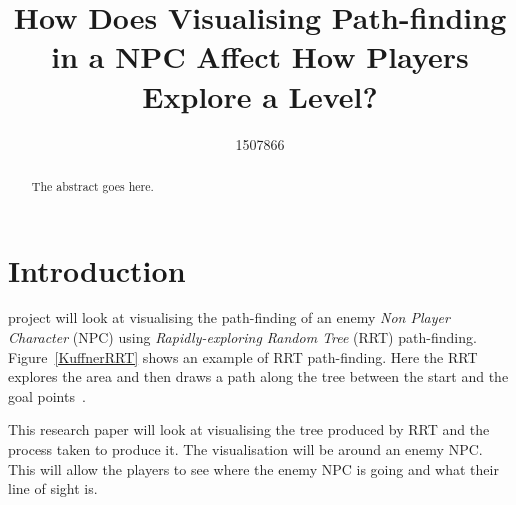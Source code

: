 \documentclass[journal]{IEEEtran}
\begin{document}
%
\title{ How Does Visualising Path-finding in a NPC Affect How Players Explore a Level?}
%
%
\author{1507866}


\maketitle

\begin{abstract}
The abstract goes here.
\end{abstract}

\section{Introduction}
% 
% 
% 
% 
 project will look at visualising the path-finding of an enemy \textit{Non Player Character} (NPC) using \textit{Rapidly-exploring Random Tree} (RRT) path-finding.  Figure~\ref{KuffnerRRT} shows an example of RRT path-finding. Here the RRT explores the area and then draws a path along the tree between the start and the goal points~\cite{Kuffner2000}. 

This research paper will look at visualising the tree produced by RRT and the process taken to produce it. The visualisation will be around an enemy NPC. This will allow the players to see where the enemy NPC is going and what their line of sight is. 
\end{document}
